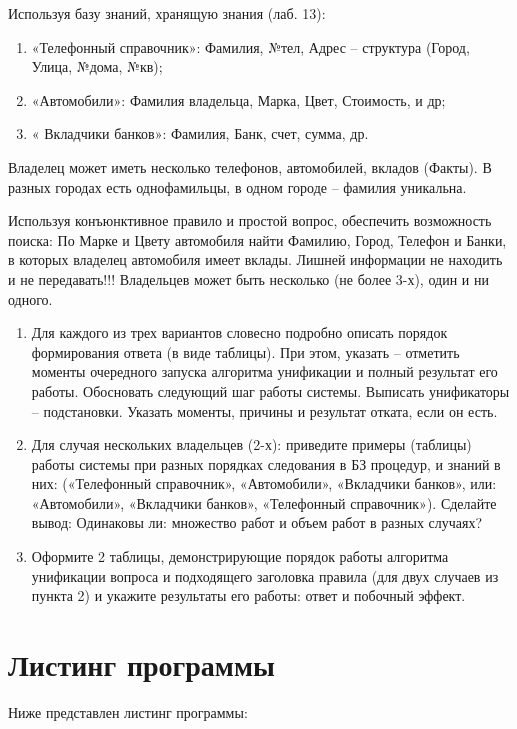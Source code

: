 \Large Используя  базу знаний, хранящую знания (лаб. 13):
\begin{enumerate}

	\item «Телефонный справочник»: Фамилия, №тел, Адрес – структура (Город, Улица, №дома, №кв);
	\item «Автомобили»: Фамилия владельца, Марка, Цвет, Стоимость, и др;
	\item « Вкладчики банков»: Фамилия, Банк, счет, сумма, др.
\end{enumerate}
Владелец может иметь несколько телефонов, автомобилей, вкладов (Факты). В разных городах есть однофамильцы, в одном городе – фамилия уникальна.

Используя конъюнктивное правило и простой вопрос, обеспечить возможность поиска:
По Марке и Цвету автомобиля найти Фамилию, Город, Телефон и Банки, в которых владелец автомобиля имеет вклады. Лишней информации не находить и не передавать!!!
Владельцев может быть несколько (не более 3-х), один и ни одного.
\begin{enumerate}
\item	Для каждого из трех вариантов словесно подробно описать порядок формирования ответа (в виде таблицы). При этом, указать – отметить моменты очередного запуска алгоритма унификации и полный результат его работы. Обосновать следующий шаг работы системы. Выписать унификаторы – подстановки. Указать моменты, причины и результат отката, если он есть.
\item	Для случая нескольких владельцев (2-х): приведите примеры (таблицы) работы системы при разных порядках следования в БЗ  процедур, и знаний в них: («Телефонный справочник», «Автомобили», «Вкладчики банков», или: «Автомобили», «Вкладчики банков», «Телефонный справочник»). Сделайте вывод: Одинаковы ли: множество работ и объем работ в разных случаях?
\item	Оформите 2 таблицы, демонстрирующие порядок работы алгоритма унификации вопроса и подходящего заголовка правила (для двух случаев из пункта 2) и укажите результаты его работы: ответ и побочный эффект.
\end{enumerate}

\newpage
\section*{Листинг программы}
Ниже представлен листинг программы:


